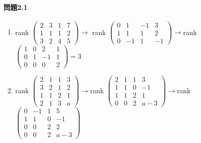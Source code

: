 \paragraph{問題2.1}
\begin{enumerate}[label=(\arabic*)]
    \item 
rank
$\begin{pmatrix}
    2 & 3 & 1 & 7 \\
    1 & 1 & 1 & 2 \\
    3 & 2 & 4 & 5
\end{pmatrix}\rightarrow$
rank
$\begin{pmatrix}
    0 & 1 & -1 & 3 \\
    1 & 1 & 1 & 2 \\
    0 & -1 & 1 & -1
\end{pmatrix}\rightarrow$rank
$\begin{pmatrix}
    1 & 0 & 2 & 1 \\
    0 & 1 & -1 & 1 \\
    0 & 0 & 0 & 2
\end{pmatrix}=3$
\item 
rank
$\begin{pmatrix}
    2 & 1 & 1 & 3 \\
    3 & 2 & 1 & 2 \\
    1 & 1 & 2 & 1 \\
    2 & 1 & 3 & a
\end{pmatrix}\rightarrow$rank
$\begin{pmatrix}
    2 & 1 & 1 & 3 \\
    1 & 1 & 0 & -1 \\
    1 & 1 & 2 & 1 \\
    0 & 0 & 2 & a-3
\end{pmatrix}\rightarrow$rank
$\begin{pmatrix}
    0 & -1 & 1 & 5 \\
    1 & 1 & 0 & -1 \\
    0 & 0 & 2 & 2 \\
    0 & 0 & 2 & a-3
\end{pmatrix}$\\ 
\end{enumerate}
